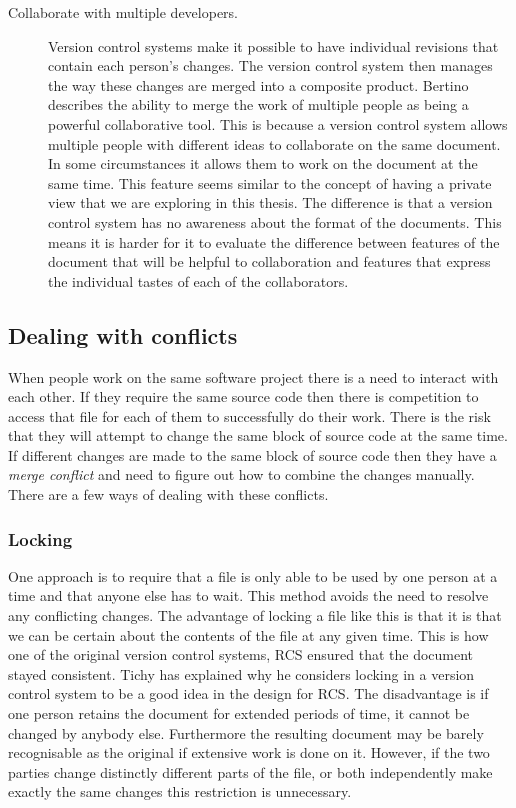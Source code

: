 \begin{description}
  \item [Collaborate with multiple developers.]
  Version control systems make it possible to have individual revisions that contain each person's changes. 
  The version control system then manages the way these changes are merged into a composite product. 
  Bertino \cite{Bertino2012} describes the ability to merge the work of multiple people as being a powerful collaborative tool. 
  This is because a version control system allows multiple people with different ideas to collaborate on the same document. 
  In some circumstances it allows them to work on the document at the same time. This feature seems similar to the concept of having a private view that we are exploring in this thesis. The difference is that a version control system has no awareness about the format of the documents. This means it is harder for it to evaluate the difference between features of the document that will be helpful to collaboration and features that express the individual tastes of each of the collaborators.

\end{description}

\subsection{Dealing with conflicts}
When people work on the same software project there is a need to interact with each other.
If they require the same source code then there is competition to access that file for each of them to successfully do their work.
There is the risk that they will attempt to change the same block of source code at the same time.
If different changes are made to the same block of source code then they have a \emph{merge conflict} and need to figure out how to combine the changes manually.
There are a few ways of dealing with these conflicts.

\subsubsection{Locking}
One approach is to require that a file is only able to be used by one person at a time and that anyone else has to wait. This method avoids the need to resolve any conflicting changes.  The advantage of locking a file like this is that it is that we can be certain about the contents of the file at any given time. This is how one of the original version control systems, RCS ensured that the document stayed consistent. Tichy \cite{Tichy1982} has explained why he considers locking in a version control system to be a good idea in the design for RCS. The disadvantage is if one person retains the document for extended periods of time, it cannot be changed by anybody else. Furthermore the resulting document may be barely recognisable as the original if extensive work is done on it. However, if the two parties change distinctly different parts of the file, or both independently make exactly the same changes this restriction is unnecessary. 
